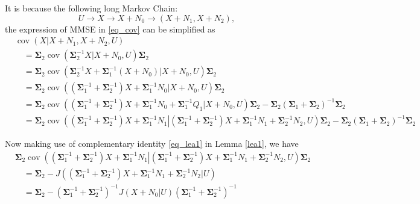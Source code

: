 \documentclass[journal,final, onecolumn]{IEEEtran}
\DeclareMathOperator{\cov}{cov}
\begin{document}
\begin{IEEEproof}
It is because the following long Markov Chain:
\begin{equation}
U \rightarrow X \rightarrow X+ {N}_{0} \rightarrow (X+N_{1},X+N_{2}),
\end{equation}
the expression of MMSE in \eqref{eq_cov} can be simplified as
\begin{align}
&\cov(X|X+N_{1},X+N_{2},U)\nonumber \\
& \quad = \boldsymbol{\Sigma}_{2} \cov \left(\boldsymbol{\Sigma}_{2}^{-1}X \left| X + {N}_{0},U \right.\right) \boldsymbol{\Sigma}_{2} \\
& \quad = \boldsymbol{\Sigma}_{2} \cov \left(\boldsymbol{\Sigma}_{2}^{-1}X  + \boldsymbol{\Sigma}_{1}^{-1} (X + {N}_{0}) \left| X + {N}_{0},U \right.\right)\boldsymbol{\Sigma}_{2} \\
&\quad = \boldsymbol{\Sigma}_{2} \cov \left(\left( \boldsymbol{\Sigma}_{1}^{-1}+ \boldsymbol{\Sigma}_{2}^{-1} \right) X  + \boldsymbol{\Sigma}_{1}^{-1} {N}_{0} \left| X + {N}_{0},U \right.\right) \boldsymbol{\Sigma}_{2} \\
&\quad = \boldsymbol{\Sigma}_{2} \cov \left(\left( \boldsymbol{\Sigma}_{1}^{-1}+ \boldsymbol{\Sigma}_{2}^{-1} \right) X  + \boldsymbol{\Sigma}_{1}^{-1} {N}_{0} + \boldsymbol{\Sigma}_{1}^{-1}Q_{1} \left| X + {N}_{0},U \right.\right)\boldsymbol{\Sigma}_{2} - \boldsymbol{\Sigma}_{2} \left( \boldsymbol{\Sigma}_{1} + \boldsymbol{\Sigma}_{2}\right)^{-1}\boldsymbol{\Sigma}_{2} \\
&\quad=\boldsymbol{\Sigma}_{2}  \cov \left(\left( \boldsymbol{\Sigma}_{1}^{-1}+ \boldsymbol{\Sigma}_{2}^{-1} \right) X  + \boldsymbol{\Sigma}_{1}^{-1} {N}_{1}  \left|\left(\boldsymbol{\Sigma}_{1}^{-1}+ \boldsymbol{\Sigma}_{2}^{-1} \right) X + \boldsymbol{\Sigma}_{1}^{-1} {N}_{1}+ \boldsymbol{\Sigma}_{2}^{-1} {N}_{2},U \right.\right)\boldsymbol{\Sigma}_{2}- \boldsymbol{\Sigma}_{2}\left( \boldsymbol{\Sigma}_{1} + \boldsymbol{\Sigma}_{2}\right)^{-1}\boldsymbol{\Sigma}_{2} \label{eq:ci1}
\end{align}

Now making use of complementary identity \eqref{eq_lea1} in Lemma \ref{lea1}, we have
\begin{align}
& \boldsymbol{\Sigma}_{2}  \cov \left(\left( \boldsymbol{\Sigma}_{1}^{-1}+ \boldsymbol{\Sigma}_{2}^{-1} \right) X  + \boldsymbol{\Sigma}_{1}^{-1} {N}_{1}  \left|\left(\boldsymbol{\Sigma}_{1}^{-1}+ \boldsymbol{\Sigma}_{2}^{-1} \right) X + \boldsymbol{\Sigma}_{1}^{-1} {N}_{1}+ \boldsymbol{\Sigma}_{2}^{-1} {N}_{2},U \right.\right)\boldsymbol{\Sigma}_{2} \nonumber\\
& \quad= \boldsymbol{\Sigma}_{2} - J(\left(\boldsymbol{\Sigma}_{1}^{-1}+ \boldsymbol{\Sigma}_{2}^{-1} \right) X + \boldsymbol{\Sigma}_{1}^{-1} {N}_{1}+ \boldsymbol{\Sigma}_{2}^{-1} {N}_{2}|U) \\
& \quad= \boldsymbol{\Sigma}_{2}- \left(\boldsymbol{\Sigma}_{1}^{-1}+ \boldsymbol{\Sigma}_{2}^{-1} \right)^{-1} J (X+N_{0}|U)\left(\boldsymbol{\Sigma}_{1}^{-1}+ \boldsymbol{\Sigma}_{2}^{-1} \right)^{-1} \label{eq:ci2}
\end{align}


\end{IEEEproof}
\end{document}
